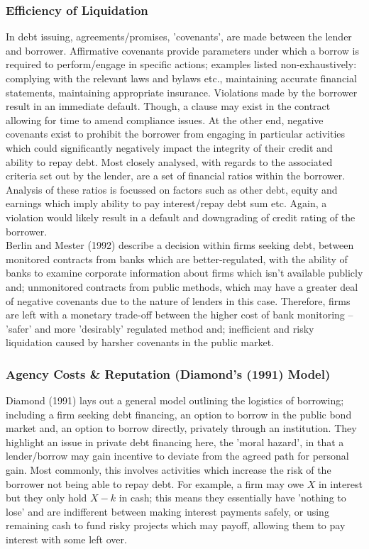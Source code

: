 \documentclass[11pt, english]{article}
\begin{document}
		\subsubsection*{Efficiency of Liquidation}

	In debt issuing, agreements/promises, 'covenants', are made between the lender and borrower. Affirmative covenants provide parameters under which a borrow is required to perform/engage in specific actions; examples listed non-exhaustively: complying with the relevant laws and bylaws etc., maintaining accurate financial statements, maintaining appropriate insurance. Violations made by the borrower result in an immediate default. Though, a clause may exist in the contract allowing for time to amend compliance issues. At the other end, negative covenants exist to prohibit the borrower from engaging in particular activities which could significantly negatively impact the integrity of their credit and ability to repay debt. Most closely analysed, with regards to the associated criteria set out by the lender, are a set of financial ratios within the borrower. Analysis of these ratios is focussed on factors such as other debt, equity and earnings which imply ability to pay interest/repay debt sum etc. Again, a violation would likely result in a default and downgrading of credit rating of the borrower.\\

	Berlin and Mester (1992) describe a decision within firms seeking debt, between monitored contracts from banks which are better-regulated, with the ability of banks to examine corporate information about firms which isn't available publicly and; unmonitored contracts from public methods, which may have a greater deal of negative covenants due to the nature of lenders in this case. Therefore, firms are left with a monetary trade-off between the higher cost of bank monitoring – 'safer' and more 'desirably' regulated method and; inefficient and risky liquidation caused by harsher covenants in the public market.

		\subsubsection*{Agency Costs \& Reputation (Diamond's (1991) Model)}

	Diamond (1991) lays out a general model outlining the logistics of borrowing; including a firm seeking debt financing, an option to borrow in the public bond market and, an option to borrow directly, privately through an institution. They highlight an issue in private debt financing here, the 'moral hazard', in that a lender/borrow may gain incentive to deviate from the agreed path for personal gain. Most commonly, this involves activities which increase the risk of the borrower not being able to repay debt. For example, a firm may owe $X$ in interest but they only hold $X-k$ in cash; this means they essentially have 'nothing to lose' and are indifferent between making interest payments safely, or using remaining cash to fund risky projects which may payoff, allowing them to pay interest with some left over.\\
\end{document}
